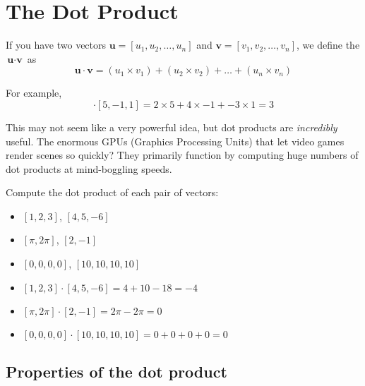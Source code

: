 \chapter{The Dot Product}

If you have two vectors $\textbf{u} = [u_1, u_2, \dots, u_n]$ and $\textbf{v} 
= [v_1, v_2,\dots, v_n]$, we define the  $\textbf{u} 
\cdot \textbf{v}$ as 
\begin{equation*}
     \textbf{u} \cdot \textbf{v} = (u_1 \times v_1) + (u_2 \times v_2) + \dots 
     + (u_n \times v_n)
\end{equation*} 

For example, 
\begin{equation*}
    [2,4, -3] \cdot [5, -1, 1] = 2 \times 5 + 4 \times -1 + -3 \times 1 = 3
\end{equation*}

This may not seem like a very powerful idea, but dot products are 
\emph{incredibly} useful. The enormous GPUs (Graphics Processing Units) that 
let video games render scenes so quickly? They primarily function by computing 
huge numbers of dot products at mind-boggling speeds. 

\begin{Exercise}[title={Basic dot products}, label=dot_products]
    Compute the dot product of each pair of vectors:
    \begin{itemize}
        \item $[1, 2, 3]$, $[4, 5, -6]$
        \item $[\pi, 2\pi]$, $[2, -1]$
        \item $[0,0,0,0]$, $[10,10,10,10]$
    \end{itemize}
\end{Exercise}
\begin{Answer}[ref=dot_products]
        \begin{itemize}
            \item $[1, 2, 3] \cdot [4, 5, -6] = 4 + 10 - 18 = -4$
            \item $[\pi, 2\pi] \cdot [2, -1] = 2\pi - 2\pi = 0$
            \item $[0,0,0,0] \cdot [10,10,10,10] = 0 + 0 + 0 + 0 = 0$ 
        \end{itemize}
\end{Answer}

\section{Properties of the dot product}

